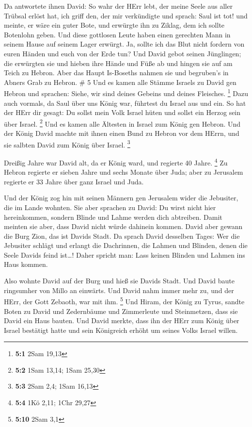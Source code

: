  Da antwortete ihnen David: So wahr der HErr lebt, der meine
Seele aus aller Trübsal erlöst hat,  ich griff den, der mir
verkündigte und sprach: Saul ist tot! und meinte, er wäre ein guter
Bote, und erwürgte ihn zu Ziklag, dem ich sollte Botenlohn geben.
 Und diese gottlosen Leute haben einen gerechten Mann in
seinem Hause auf seinem Lager erwürgt. Ja, sollte ich das Blut nicht
fordern von euren Händen und euch von der Erde tun?  Und
David gebot seinen Jünglingen; die erwürgten sie und hieben ihre Hände
und Füße ab und hingen sie auf am Teich zu Hebron. Aber das Haupt
Is-Boseths nahmen sie und begruben's in Abners Grab zu Hebron. \# 5
 Und es kamen alle Stämme Israels zu David gen Hebron und
sprachen: Siehe, wir sind deines Gebeins und deines Fleisches.
\footnote{\textbf{5:1} 2Sam 19,13}  Dazu auch vormals, da
Saul über uns König war, führtest du Israel aus und ein. So hat der HErr
dir gesagt: Du sollst mein Volk Israel hüten und sollst ein Herzog sein
über Israel. \footnote{\textbf{5:2} 1Sam 13,14; 1Sam 25,30} 
Und es kamen alle Ältesten in Israel zum König gen Hebron. Und der König
David machte mit ihnen einen Bund zu Hebron vor dem HErrn, und sie
salbten David zum König über Israel. \footnote{\textbf{5:3} 2Sam 2,4;
  1Sam 16,13}

 Dreißig Jahre war David alt, da er König ward, und regierte
40 Jahre. \footnote{\textbf{5:4} 1Kö 2,11; 1Chr 29,27}  Zu
Hebron regierte er sieben Jahre und sechs Monate über Juda; aber zu
Jerusalem regierte er 33 Jahre über ganz Israel und Juda.

 Und der König zog hin mit seinen Männern gen Jerusalem
wider die Jebusiter, die im Lande wohnten. Sie aber sprachen zu David:
Du wirst nicht hier hereinkommen, sondern Blinde und Lahme werden dich
abtreiben. Damit meinten sie aber, dass David nicht würde dahinein
kommen.  David aber gewann die Burg Zion, das ist Davids
Stadt.  Da sprach David desselben Tages: Wer die Jebusiter
schlägt und erlangt die Dachrinnen, die Lahmen und Blinden, denen die
Seele Davids feind ist\ldots! Daher spricht man: Lass keinen Blinden und
Lahmen ins Haus kommen.

 Also wohnte David auf der Burg und hieß sie Davids Stadt.
Und David baute ringsumher von Millo an einwärts.  Und
David nahm immer mehr zu, und der HErr, der Gott Zebaoth, war mit ihm.
\footnote{\textbf{5:10} 2Sam 3,1}  Und Hiram, der König zu
Tyrus, sandte Boten zu David und Zedernbäume und Zimmerleute und
Steinmetzen, dass sie David ein Haus bauten.  Und David
merkte, dass ihn der HErr zum König über Israel bestätigt hatte und sein
Königreich erhöht um seines Volks Israel willen.

